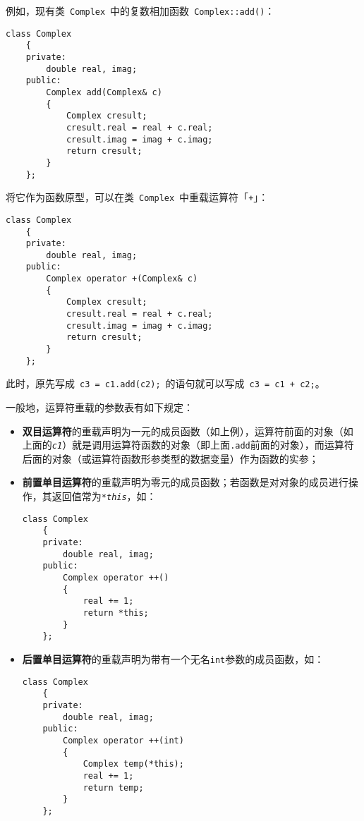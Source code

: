 \documentclass[10pt, a4paper, oneside, fontset=none]{ctexart}
\theoremstyle{plain}
\theoremstyle{definition}
\newcommand{\colors}[1]{\color{#1!75!black}}
\begin{document}
例如，现有类~\lstinline[moreemph={Complex}, emphstyle=\colors{qinglv}]|Complex|~中的复数相加函数~\lstinline[moreemph={Complex}, emphstyle=\colors{qinglv}]|Complex::add()|：
\begin{lstlisting}[moreemph={Complex}, emphstyle=\colors{qinglv}, moreemph={[2]{real, imag, c, cresult}}, emphstyle={[2]\it\ttfamily},]
	class Complex
	{
	private:
		double real, imag;
	public:
		Complex add(Complex& c)
		{
			Complex cresult;
			cresult.real = real + c.real;
			cresult.imag = imag + c.imag;
			return cresult;
		}
	};
\end{lstlisting}
将它作为函数原型，可以在类~\lstinline[moreemph={Complex}, emphstyle=\colors{qinglv}]|Complex|~中重载运算符「\texttt{+}」：
\begin{lstlisting}[moreemph={Complex}, emphstyle=\colors{qinglv}, moreemph={[2]{real, imag, c, cresult}}, emphstyle={[2]\it\ttfamily},]
	class Complex
	{
	private:
		double real, imag;
	public:
		Complex operator +(Complex& c)
		{
			Complex cresult;
			cresult.real = real + c.real;
			cresult.imag = imag + c.imag;
			return cresult;
		}
	};
\end{lstlisting}
此时，原先写成~\lstinline[moreemph={[2]{c1, c2, c3}}, emphstyle={[2]\it\ttfamily},]|c3 = c1.add(c2);|~的语句就可以写成~\lstinline[moreemph={[2]{c1, c2, c3}}, emphstyle={[2]\it\ttfamily},]|c3 = c1 + c2;|。

一般地，运算符重载的参数表有如下规定：
\begin{itemize}
	\item \textbf{双目运算符}的重载声明为一元的成员函数（如上例），运算符前面的对象（如上面的\texttt{\textit{c1}}）就是调用运算符函数的对象（即上面\texttt{.add}前面的对象），而运算符后面的对象（或运算符函数形参类型的数据变量）作为函数的实参；
	
	\item \textbf{前置单目运算符}的重载声明为零元的成员函数；若函数是对对象的成员进行操作，其返回值常为\texttt{*\textit{this}}，如：
	\begin{lstlisting}[xleftmargin=1em, moreemph={Complex}, emphstyle=\colors{qinglv}, moreemph={[2]{real, imag, this}}, emphstyle={[2]\it\ttfamily},]
	class Complex
	{
	private:
		double real, imag;
	public:
		Complex operator ++()
		{
			real += 1;
			return *this;
		}
	};			
	\end{lstlisting}
	\item \textbf{后置单目运算符}的重载声明为带有一个无名\texttt{int}参数的成员函数，如：
	\begin{lstlisting}[xleftmargin=1em, moreemph={Complex}, emphstyle=\colors{qinglv}, moreemph={[2]{real, imag, this, temp}}, emphstyle={[2]\it\ttfamily},]
	class Complex
	{
	private:
		double real, imag;
	public:
		Complex operator ++(int)
		{
			Complex temp(*this);
			real += 1;
			return temp;
		}
	};
	\end{lstlisting}
\end{itemize}
\end{document}
